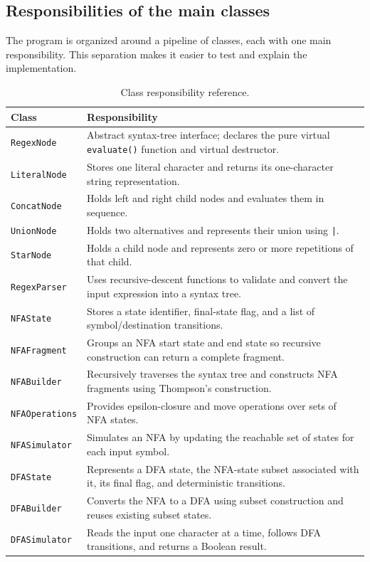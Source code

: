 \documentclass[12pt,a4paper]{report}
\begin{document}
\subsection{Responsibilities of the main classes}
The program is organized around a pipeline of classes, each with one main responsibility. This separation makes it easier to test and explain the implementation.
\begin{table}[htbp]
\centering
\caption{Class responsibility reference.}
\small
\begin{tabular}{|p{3.0cm}|p{9.7cm}|}
\hline
\textbf{Class} & \textbf{Responsibility} \\
\hline
\texttt{RegexNode} & Abstract syntax-tree interface; declares the pure virtual \texttt{evaluate()} function and virtual destructor. \\
\hline
\texttt{LiteralNode} & Stores one literal character and returns its one-character string representation. \\
\hline
\texttt{ConcatNode} & Holds left and right child nodes and evaluates them in sequence. \\
\hline
\texttt{UnionNode} & Holds two alternatives and represents their union using \texttt{|}. \\
\hline
\texttt{StarNode} & Holds a child node and represents zero or more repetitions of that child. \\
\hline
\texttt{RegexParser} & Uses recursive-descent functions to validate and convert the input expression into a syntax tree. \\
\hline
\texttt{NFAState} & Stores a state identifier, final-state flag, and a list of symbol/destination transitions. \\
\hline
\texttt{NFAFragment} & Groups an NFA start state and end state so recursive construction can return a complete fragment. \\
\hline
\texttt{NFABuilder} & Recursively traverses the syntax tree and constructs NFA fragments using Thompson's construction. \\
\hline
\texttt{NFAOperations} & Provides epsilon-closure and move operations over sets of NFA states. \\
\hline
\texttt{NFASimulator} & Simulates an NFA by updating the reachable set of states for each input symbol. \\
\hline
\texttt{DFAState} & Represents a DFA state, the NFA-state subset associated with it, its final flag, and deterministic transitions. \\
\hline
\texttt{DFABuilder} & Converts the NFA to a DFA using subset construction and reuses existing subset states. \\
\hline
\texttt{DFASimulator} & Reads the input one character at a time, follows DFA transitions, and returns a Boolean result. \\
\hline
\end{tabular}
\end{table}
\end{document}
